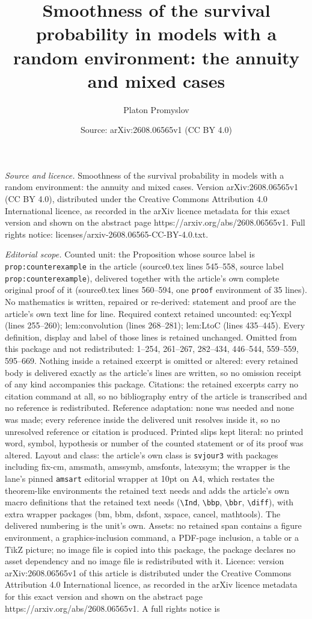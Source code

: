 \documentclass[10pt,a4paper]{amsart}
\title[Smoothness of the survival probability in models with a rand]{Smoothness of the survival probability in models with a random environment: the annuity and mixed cases}
\author{Platon Promyslov}
\date{Source: arXiv:2608.06565v1 (CC BY 4.0)}
\begin{document}
\maketitle

\noindent\emph{Source and licence.} Smoothness of the survival probability in models with a random environment: the annuity and mixed cases. Version arXiv:2608.06565v1 (CC BY 4.0), distributed under the Creative Commons Attribution 4.0 International licence, as recorded in the arXiv licence metadata for this exact version and shown on the abstract page https://arxiv.org/abs/2608.06565v1. Full rights notice: licenses/arxiv-2608.06565-CC-BY-4.0.txt.\par\smallskip

\noindent\textit{Editorial scope.} Counted unit: the Proposition whose source label is \texttt{prop:counterexample} in the article (source0.tex lines 545--558, source label \texttt{prop:counterexample}), delivered together with the article's own complete original proof of it (source0.tex lines 560--594, one \texttt{proof} environment of 35 lines). No mathematics is written, repaired or re-derived: statement and proof are the article's own text line for line. Required context retained uncounted: eq:Yexpl (lines 255--260); lem:convolution (lines 268--281); lem:LtoC (lines 435--445). Every definition, display and label of those lines is retained unchanged. Omitted from this package and not redistributed: 1--254, 261--267, 282--434, 446--544, 559--559, 595--669. Nothing inside a retained excerpt is omitted or altered: every retained body is delivered exactly as the article's lines are written, so no omission receipt of any kind accompanies this package. Citations: the retained excerpts carry no citation command at all, so no bibliography entry of the article is transcribed and no reference is redistributed. Reference adaptation: none was needed and none was made; every reference inside the delivered unit resolves inside it, so no unresolved reference or citation is produced. Printed slips kept literal: no printed word, symbol, hypothesis or number of the counted statement or of its proof was altered. Layout and class: the article's own class is \texttt{svjour3} with packages including fix-cm, amsmath, amssymb, amsfonts, latexsym; the wrapper is the lane's pinned \texttt{amsart} editorial wrapper at 10pt on A4, which restates the theorem-like environments the retained text needs and adds the article's own macro definitions that the retained text needs (\texttt{\textbackslash Ind}, \texttt{\textbackslash bbp}, \texttt{\textbackslash bbr}, \texttt{\textbackslash diff}), with extra wrapper packages (bm, bbm, dsfont, xspace, cancel, mathtools). The delivered numbering is the unit's own. Assets: no retained span contains a figure environment, a graphics-inclusion command, a PDF-page inclusion, a table or a TikZ picture; no image file is copied into this package, the package declares no asset dependency and no image file is redistributed with it. Licence: version arXiv:2608.06565v1 of this article is distributed under the Creative Commons Attribution 4.0 International licence, as recorded in the arXiv licence metadata for this exact version and shown on the abstract page https://arxiv.org/abs/2608.06565v1. A full rights notice is 
\end{document}
